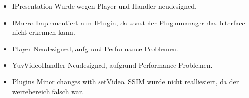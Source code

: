 \begin{itemize}
\item IPresentation \newline
Wurde wegen Player und Handler neudesigned.
\item IMacro \newline
Implementiert nun IPlugin, da sonst der Pluginmanager das Interface nicht erkennen kann.
\item Player \newline
Neudesigned, aufgrund Performance Problemen.
\item YuvVideoHandler \newline
Neudesigned, aufgrund Performance Problemen.
\item Plugins \newline
Minor changes with setVideo. SSIM wurde nicht realliesiert, da der wertebereich falsch war.

\end{itemize}


